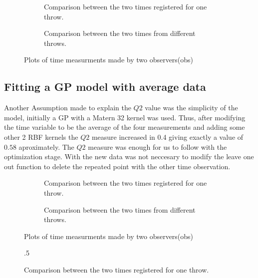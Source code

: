 \begin{figure}
	\begin{subfigure}[h]{.5\linewidth}
		
		\caption{Comparison between the two times registered for one throw.}
		\label{fig_EX1_EX1}
	\end{subfigure}
	\begin{subfigure}[h]{.5\linewidth}
		
		\caption{Comparison between the two times from different throws.}
		\label{fig_EX1_EX2}
	\end{subfigure}
	\caption{Plots of time measurments made by two observers(obs)}
\end{figure}

\subsection{Fitting a GP model with average data}

Another Assumption made to explain the $Q2$ value was the simplicity of the model, initially a GP with a Matern 32 kernel was used. Thus, after modifying the time variable to be the average of the four measurements and adding some other 2 RBF kernels the $Q2$ measure increased in 0.4 giving exactly a value of $0.58$ aproximately. The $Q2$ measure was enough for us to follow with the optimization stage. With the new data was not neccesary to modify the leave one out function to delete the repeated point with the other time observation.

\begin{figure}
	\begin{subfigure}[h]{.5\linewidth}
		
		\caption{Comparison between the two times registered for one throw.}
		\label{fig_wtr_vs_obs2}
	\end{subfigure}
	\begin{subfigure}[h]{.5\linewidth}
		
		\caption{Comparison between the two times from different throws.}
		\label{fig_wtr_vs_avg4}
	\end{subfigure}
	\caption{Plots of time measurments made by two observers(obs)}
\end{figure}


\begin{figure}[h]{.5\linewidth}
	
	\caption{Comparison between the two times registered for one throw.}
	\label{mloo_vs_real}
\end{figure}
